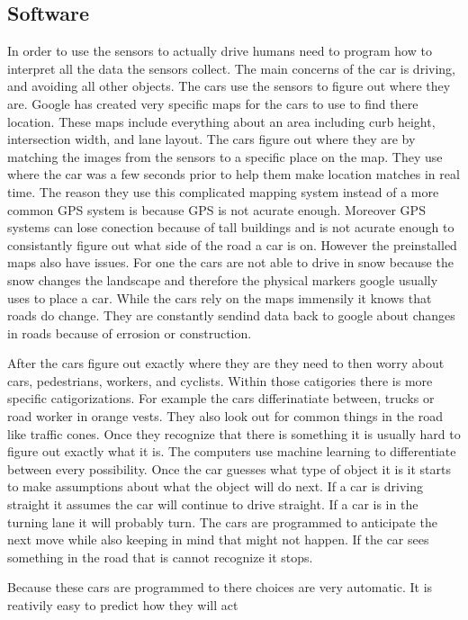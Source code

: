 \documentclass[11pt]{article}
\begin{document}
\subsection{Software}
\par
In order to use the sensors to actually drive humans need to program how to interpret all the data the sensors collect. The main concerns of the car is driving, and avoiding all other objects. 
The cars use the sensors to figure out where they are. Google has created very specific maps for the cars to use to find there location. These maps include everything about an area including curb height, intersection width, and lane layout. 
The cars figure out where they are by matching the images from the sensors to
a specific place on the map. They use where the car was a few seconds prior to help them make location matches in real
time. The reason they use this complicated mapping system instead of a more common GPS system is because GPS is not
acurate enough. Moreover GPS systems can lose conection because of tall buildings and is not acurate enough to
consistantly figure out what side of the road a car is on. However the preinstalled maps also have issues. For one the
cars are not able to drive in snow because the snow changes the landscape and therefore the physical markers google
usually uses to place a car. While the cars rely on the maps immensily it knows that roads do change. They are
constantly sendind data back to google about changes in roads because of errosion or construction. \par
After the cars figure out exactly where they are they need to then worry about cars, pedestrians, workers, and cyclists.
Within those catigories there is more specific catigorizations. For example the cars differinatiate between, trucks or
road worker in orange vests. They also look out for common things in the road like traffic cones. Once they recognize
that there is something it is usually hard to figure out exactly what it is. The computers use machine learning to
differentiate between every possibility. Once the car guesses what type of object it is it starts to make assumptions
about what the object will do next. If a car is driving straight it assumes the car will continue to drive straight. If
a car is in the turning lane it will probably turn. The cars are programmed to anticipate the next move while also
keeping in mind that might not happen. If the car sees something in the road that is cannot recognize it stops. 
\par
Because these cars are programmed to there choices are very automatic. It is reativily easy to predict how they will act
\end{document}
